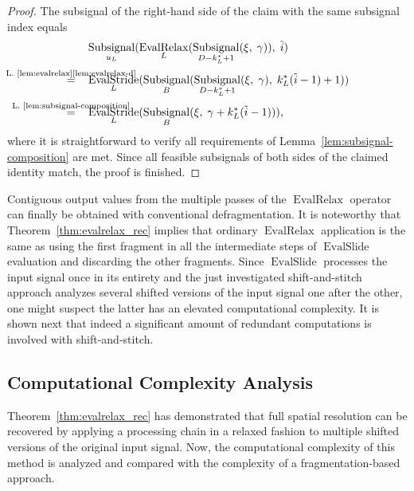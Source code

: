 \documentclass[journal]{IEEEtran}
\newcommand{\ROI}{B}
\DeclareMathOperator{\Subsignal}{Subsignal}
\DeclareMathOperator{\EvalStride}{EvalStride}
\DeclareMathOperator{\EvalSlide}{EvalSlide}
\newcommand{\equsing}[1]{\overset{\mathclap{\text{#1}}}{=}}
\DeclareMathOperator{\EvalRelax}{EvalRelax}
\begin{document}
\begin{proof}
The subsignal of the right-hand side of the claim with the same subsignal index equals
\begin{align*}
  & \Subsignal_{u_L}(\EvalRelax_L(\Subsignal_{D - k_L^* + 1}(\xi,\;\gamma)),\;\tilde{i})\\
  \equsing{L.~\ref{lem:evalrelax}\ref{lem:evalrelax-d}}\ \ \ & \EvalStride_L(\Subsignal_\ROI(\Subsignal_{D - k_L^* + 1}(\xi,\;\gamma),\; k_L^*(\tilde{i} - 1) + 1))\\
  \equsing{L.~\ref{lem:subsignal-composition}}\ \ \ & \EvalStride_L(\Subsignal_\ROI(\xi,\; \gamma + k_L^*(\tilde{i} - 1)))\text{,}
\end{align*}
where it is straightforward to verify all requirements of Lemma~\ref{lem:subsignal-composition} are met.
Since all feasible subsignals of both sides of the claimed identity match, the proof is finished.
\end{proof}

Contiguous output values from the multiple passes of the $\EvalRelax$ operator can finally be obtained with conventional defragmentation.
It is noteworthy that Theorem~\ref{thm:evalrelax_rec} implies that ordinary $\EvalRelax$ application is the same as using the first fragment in all the intermediate steps of $\EvalSlide$ evaluation and discarding the other fragments.
Since $\EvalSlide$ processes the input signal once in its entirety and the just investigated shift-and-stitch approach analyzes several shifted versions of the input signal one after the other, one might suspect the latter has an elevated computational complexity.
It is shown next that indeed a significant amount of redundant computations is involved with shift-and-stitch.

\subsection{Computational Complexity Analysis}
Theorem~\ref{thm:evalrelax_rec} has demonstrated that full spatial resolution can be recovered by applying a processing chain in a relaxed fashion to multiple shifted versions of the original input signal.
Now, the computational complexity of this method is analyzed and compared with the complexity of a fragmentation-based approach.
\end{document}
